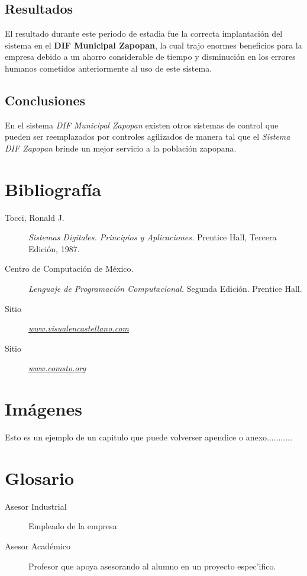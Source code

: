 \documentclass[12pt,spanish]{report}
\begin{document}
\section{Resultados}

El resultado durante este periodo de estadia fue la correcta implantaci\'on del sistema en el \textbf{DIF Municipal Zapopan}, la cual trajo enormes beneficios para la empresa debido a un ahorro considerable de tiempo y disminuci\'on en los errores humanos cometidos anteriormente al uso de este sistema.

\section{Conclusiones}

En el sistema \emph{DIF Municipal Zapopan} existen otros sistemas de control que pueden ser reemplazados por controles agilizados de manera tal que el \emph{Sistema DIF Zapopan} brinde un mejor servicio a la poblaci\'on zapopana.\\

\newpage

\appendix
\chapter{Bibliograf\'ia}

\begin{description}
\item[Tocci, Ronald J.]{\emph{Sistemas Digitales. Principios y Aplicaciones.}} Prentice Hall, Tercera Edici\'on, 1987.
\item[Centro de Computaci\'on de M\'exico.] {\emph{Lenguaje de Programaci\'on Computacional.}} Segunda Edici\'on. Prentice Hall.
\item[Sitio] \underline{\emph{www.visualencastellano.com}}
\item[Sitio] \underline{\emph{www.comsto.org}}
\end{description}

\newpage

\chapter{Im\'agenes}

Esto es un ejemplo de un capitulo que puede volverser apendice o anexo...........

\newpage

\chapter{Glosario}

\begin{description}
\item[Asesor Industrial] Empleado de la empresa
\item[Asesor Acad\'emico] Profesor que apoya asesorando al alumno en un proyecto espec'ifico.
\end{description}

\newpage


\end{document}
